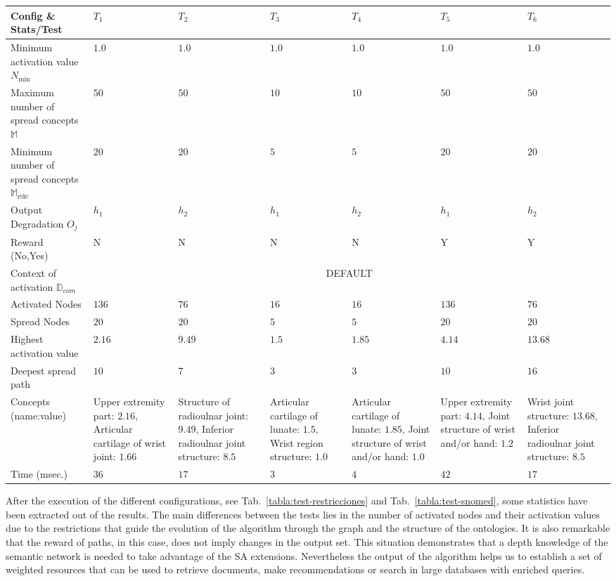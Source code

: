 \begin{table*}[p]
\renewcommand{\arraystretch}{1.3}
\begin{center}
\begin{tabular}{|p{3cm}|p{1.5cm}|p{1.5cm}|p{1.5cm}|p{1.5cm}|p{1.5cm}|p{1.5cm}|}
\hline
        \textbf{Config \& Stats/Test}&$T_1$&$T_2$&$T_3$&$T_4$&$T_5$&$T_6$\\ \hline
        \hline
        Minimum activation value $N_{\min}$ &$1.0$ &$1.0$ &$1.0$ &$1.0$&$1.0$&$1.0$ \\ \hline
	Maximum number of spread concepts $\mathbb{M}$&$50$ &$50$ &$10$ &$10$&$50$&$50$\\ \hline
	Minimum number of spread concepts $\mathbb{M_{\min}}$&$20$ &$20$ &$5$ &$5$&$20$&$20$  \\ \hline
	Output Degradation $O_j$ & $h_1$ &$h_2$ &$h_1$ &$h_2$&$h_1$&$h_2$\\ \hline
	Reward (No,Yes) &N &N &N &N&Y&Y\\ \hline
	\hline
	Context of activation $\mathbb{D}_{com}$&\multicolumn{6}{|c|}{DEFAULT} \\ \hline
	Activated Nodes &$136$ &$76$ &$16$ &$16$&$136$&$76$ \\ \hline
	Spread Nodes &$20$ &$20$ &$5$ &$5$&$20$&$20$ \\ \hline
	Highest activation value &$2.16$ &$9.49$ &$1.5$ &$1.85$&$4.14$&$13.68$\\ \hline
	Deepest spread path &$10$ &$7$&$3$ &$3$&$10$&$16$\\ \hline
	Concepts (name:value) & Upper extremity part: $2.16$, Articular cartilage of wrist joint: $1.66$ &Structure of radioulnar joint: $9.49$, Inferior radioulnar joint structure: $8.5$ &Articular cartilage of lunate: $1.5$, Wrist region structure: $1.0$ &Articular cartilage of lunate: $1.85$, Joint structure of wrist and/or hand: $1.0$&Upper extremity part: $4.14$, Joint structure of wrist and/or hand: $1.2$&Wrist joint structure: $13.68$, Inferior radioulnar joint structure: $8.5$ \\ \hline
	Time (msec.) & $36$ &$17$ &$3$ &$4$&$42$&$17$ \\ \hline
\end{tabular}
  \caption{Configuration and statistics of results after the execution and refinement of SA over the SNOMED CT ontology.}
  \label{tabla:test-snomed}
  \end{center}
\end{table*} 


After the execution of the different configurations, see Tab.~\ref{tabla:test-restricciones} and Tab.~\ref{tabla:test-snomed}, 
some statistics have been extracted out of the results. 
The main differences between the tests lies in the number of activated nodes and their activation values due to the restrictions that guide the evolution
of the algorithm through the graph and the structure of the ontologies. 
It is also remarkable that the reward of paths, in this case, does not imply changes in the output set. This situation demonstrates 
that a depth knowledge of the semantic network is needed to take advantage of the SA extensions. Nevertheless the output of the
algorithm helps us to establish a set of weighted resources that can be used to retrieve documents, make recommendations or search in 
large databases with enriched queries.